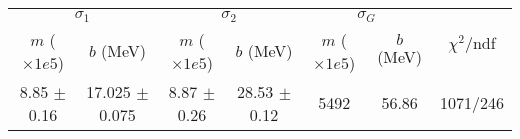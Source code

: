 \begin{tabular}{cc|cc|cc||c}
\multicolumn{2}{c|}{$\sigma_1$} & \multicolumn{2}{|c}{$\sigma_2$} & \multicolumn{2}{|c}{$\sigma_G$}  & \multirow{2}{*}{$\chi^2/$ndf}\\
$m$ ($\times1e5$) & $b$ (MeV) & $m$ ($\times1e5$) & $b$ (MeV) & $m$ ($\times1e5$) & $b$ (MeV) & \\
\hline
8.85 $\pm$ 0.16 & 17.025 $\pm$ 0.075 & 8.87 $\pm$ 0.26 & 28.53 $\pm$ 0.12 & 5492 & 56.86 & 1071/246\\
\end{tabular}
